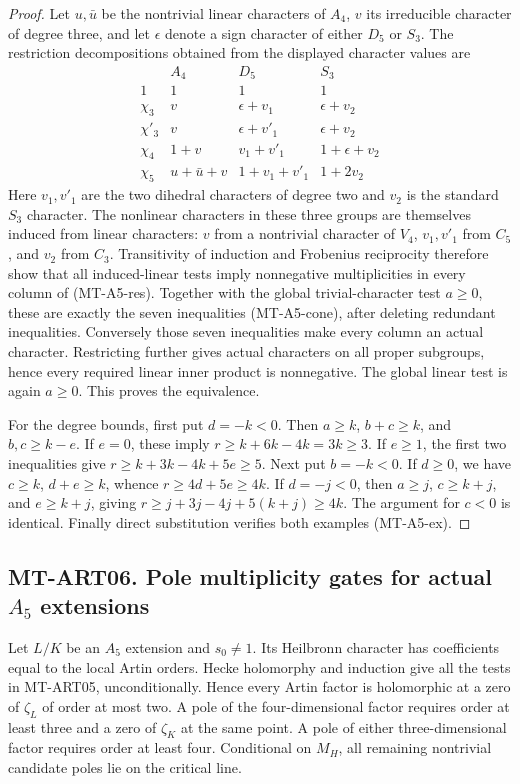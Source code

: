 \begin{proof}
Let $u,\bar u$ be the nontrivial linear characters of $A_4$,
$v$ its irreducible character of degree three, and let $\epsilon$
denote a sign character of either $D_5$ or $S_3$. The restriction
decompositions obtained from the displayed character values are
\[
\begin{array}{c|ccc}
 & A_4 & D_5 & S_3\\\hline
1&1&1&1\\
\chi_3&v&\epsilon+v_1&\epsilon+v_2\\
\chi'_3&v&\epsilon+v'_1&\epsilon+v_2\\
\chi_4&1+v&v_1+v'_1&1+\epsilon+v_2\\
\chi_5&u+\bar u+v&1+v_1+v'_1&1+2v_2
\end{array}                                                   \tag{MT-A5-res}
\]
Here $v_1,v'_1$ are the two dihedral characters of degree two and
$v_2$ is the standard $S_3$ character. The nonlinear characters in
these three groups are themselves induced from linear characters:
$v$ from a nontrivial character of $V_4$, $v_1,v'_1$ from $C_5$,
and $v_2$ from $C_3$. Transitivity of induction and Frobenius reciprocity
therefore show that all induced-linear tests imply nonnegative
multiplicities in every column of (MT-A5-res). Together with the
global trivial-character test $a\ge0$, these are exactly the seven
inequalities (MT-A5-cone), after deleting redundant inequalities.
Conversely those seven inequalities make every column an actual
character. Restricting further gives actual characters on all proper
subgroups, hence every required linear inner product is nonnegative.
The global linear test is again $a\ge0$. This proves the equivalence.

For the degree bounds, first put $d=-k<0$. Then $a\ge k$,
$b+c\ge k$, and $b,c\ge k-e$. If $e=0$, these imply
$r\ge k+6k-4k=3k\ge3$. If $e\ge1$, the first two inequalities give
$r\ge k+3k-4k+5e\ge5$. Next put $b=-k<0$. If $d\ge0$, we have
$c\ge k$, $d+e\ge k$, whence
$r\ge4d+5e\ge4k$. If $d=-j<0$, then
$a\ge j$, $c\ge k+j$, and $e\ge k+j$, giving
$r\ge j+3j-4j+5(k+j)\ge4k$. The argument for $c<0$ is identical.
Finally direct substitution verifies both examples (MT-A5-ex).
\end{proof}

\subsection*{MT-ART06. Pole multiplicity gates for actual \texorpdfstring{$A_5$}{A5} extensions}
Let $L/K$ be an $A_5$ extension and $s_0\ne1$. Its Heilbronn character
has coefficients equal to the local Artin orders. Hecke holomorphy and
induction give all the tests in MT-ART05, unconditionally. Hence every
Artin factor is holomorphic at a zero of $\zeta_L$ of order at most two.
A pole of the four-dimensional factor requires order at least three
and a zero of $\zeta_K$ at the same point. A pole of either
three-dimensional factor requires order at least four. Conditional on
$M_H$, all remaining nontrivial candidate poles lie on the critical line.

